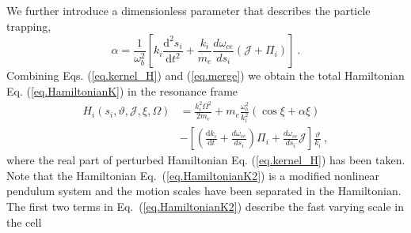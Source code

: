 We further  introduce a dimensionless parameter that describes the particle trapping,
\begin{equation}\label{eq.alp0}
    \alpha = \frac{1}{\omega_b^2}\left[k_i \frac{\mathrm{d}^{2} s_{i}}{\mathrm{d} t^{2}}+ \frac{k_i}{m_{e}} \frac{d \omega_{ce}}{d s_{i}}\left(\mathcal{J}+\Pi_{i}\right)\right]~.
\end{equation}
Combining Eqs. (\ref{eq.kernel_H}) and (\ref{eq.merge}) we obtain the total Hamiltonian  
Eq. (\ref{eq.HamiltonianK})
in the resonance frame
\begin{equation}\label{eq.HamiltonianK2}
    \begin{aligned}
    H_i(s_i,\vartheta,\mathcal{J},\xi,\Omega) &= \frac{k_{i}^{2}\Omega^{2}}{2 m_{e}} + m_e \frac{\omega_b^2}{k_i^2} ( \cos \xi + \alpha \xi) 
    \\
    &- \left[\left(\frac{\mathrm{d} k_{i}}{\mathrm{d} t}+\frac{d \omega_{ce}}{d s_{i}}\right) \Pi_{i}+\frac{d \omega_{ce}}{d s_{i}} \mathcal{J}\right] \frac{\vartheta}{k_{i}}~,
    \end{aligned}
\end{equation}
where the real part of perturbed Hamiltonian Eq. (\ref{eq.kernel_H}) has been taken.
Note that the Hamiltonian Eq.~(\ref{eq.HamiltonianK2}) is 
a modified nonlinear pendulum  system
and
the motion scales have been separated in the Hamiltonian.
The first two terms in Eq.~(\ref{eq.HamiltonianK2}) describe the fast varying scale in the cell
